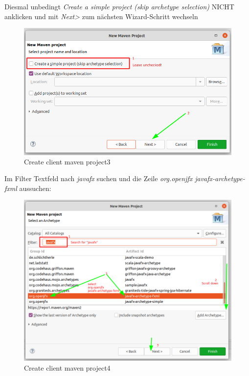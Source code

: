 \documentclass[11pt]{scrartcl}
\begin{document}
\newpage
Diesmal unbedingt \textit{Create a simple project (skip archetype selection)}
NICHT anklicken und mit \textit{Next>} zum nächsten Wizard-Schritt wechseln
\begin{figure}[!ht]
    \includegraphics[width=\linewidth]{images/eclipse16_client_maven_project3.png}
    \caption{Create client maven project3}
    \label{fig:createclientproject3}
\end{figure}

\newpage
Im Filter Textfeld nach \textit{javafx} suchen und die Zeile
\textit{org.openjfx javafx-archetype-fxml} aussuchen:
\begin{figure}[!ht]
    \includegraphics[width=\linewidth]{images/eclipse17_client_maven_project4.png}
    \caption{Create client maven project4}
    \label{fig:createclientproject4}
\end{figure}
\end{document}

